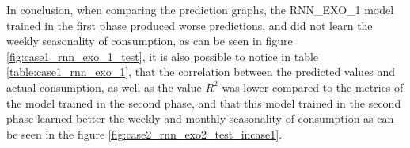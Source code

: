                 \begin{figure}[H]
                        \end{figure}        
        


     \begin{figure}[H]
                \end{figure}        In conclusion, when comparing the prediction graphs, the  RNN\_EXO\_1 model trained in the first phase produced worse predictions, and did not learn the weekly seasonality of consumption, as can be seen in figure  \ref{fig:case1_rnn_exo_1_test}, it is also possible to notice in table  \ref{table:case1_rnn_exo_1}, that the correlation between the predicted values and actual consumption, as well as the value  $R^2$ was lower compared to the metrics of the model trained in the second phase, and that this model trained in the second phase learned better the weekly and monthly seasonality of consumption as can be seen in the figure \ref{fig:case2_rnn_exo2_test_incase1}.
      
